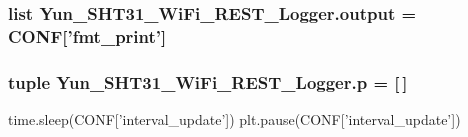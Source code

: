 \hypertarget{namespaceYun__SHT31__WiFi__REST__Logger_ad449e0bc29b40e813c66bfd22caee772}{
\subsubsection[{output}]{\setlength{\rightskip}{0pt plus 5cm}list Yun\-\_\-\-S\-H\-T31\-\_\-\-Wi\-Fi\-\_\-\-R\-E\-S\-T\-\_\-\-Logger.\-output = {\bf C\-O\-N\-F}\mbox{[}'fmt\-\_\-print'\mbox{]}}}\label{namespaceYun__SHT31__WiFi__REST__Logger_ad449e0bc29b40e813c66bfd22caee772}
\hypertarget{namespaceYun__SHT31__WiFi__REST__Logger_a4ef8fe44943a727c006ec1a4aa9ca85d}{
\subsubsection[{p}]{\setlength{\rightskip}{0pt plus 5cm}tuple Yun\-\_\-\-S\-H\-T31\-\_\-\-Wi\-Fi\-\_\-\-R\-E\-S\-T\-\_\-\-Logger.\-p = \mbox{[}$\,$\mbox{]}}}\label{namespaceYun__SHT31__WiFi__REST__Logger_a4ef8fe44943a727c006ec1a4aa9ca85d}


time.\-sleep(C\-O\-N\-F\mbox{[}'interval\-\_\-update'\mbox{]}) plt.\-pause(C\-O\-N\-F\mbox{[}'interval\-\_\-update'\mbox{]}) 


